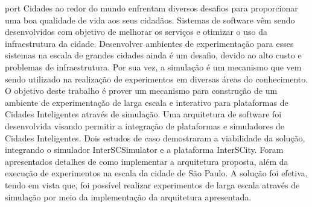 
\begin{resumo}{port}
Cidades ao redor do mundo enfrentam diversos desafios para proporcionar uma boa qualidade de vida aos seus cidadãos.
Sistemas de software vêm sendo desenvolvidos com objetivo de melhorar os serviços e otimizar o uso da infraestrutura da cidade.
Desenvolver ambientes de experimentação para esses sistemas na escala de grandes cidades ainda é um desafio, devido ao alto custo e problemas de infraestrutura.
Por sua vez, a simulação é um mecanismo que vem sendo utilizado na realização de experimentos em diversas áreas do conhecimento.
O objetivo deste trabalho é prover um mecanismo para construção de um ambiente de experimentação de larga escala e interativo para plataformas de Cidades Inteligentes através de simulação.
Uma arquitetura de software foi desenvolvida visando permitir a integração de plataformas e simuladores de Cidades Inteligentes.
Dois estudos de caso demostraram a viabilidade da solução, integrando o simulador InterSCSimulator e a plataforma InterSCity.
Foram apresentados detalhes de como implementar a arquitetura proposta, além da execução de experimentos na escala da cidade de São Paulo.
A solução foi efetiva, tendo em vista que, foi possível realizar experimentos de larga escala através de simulação por meio da implementação da arquitetura apresentada.
\end{resumo}

